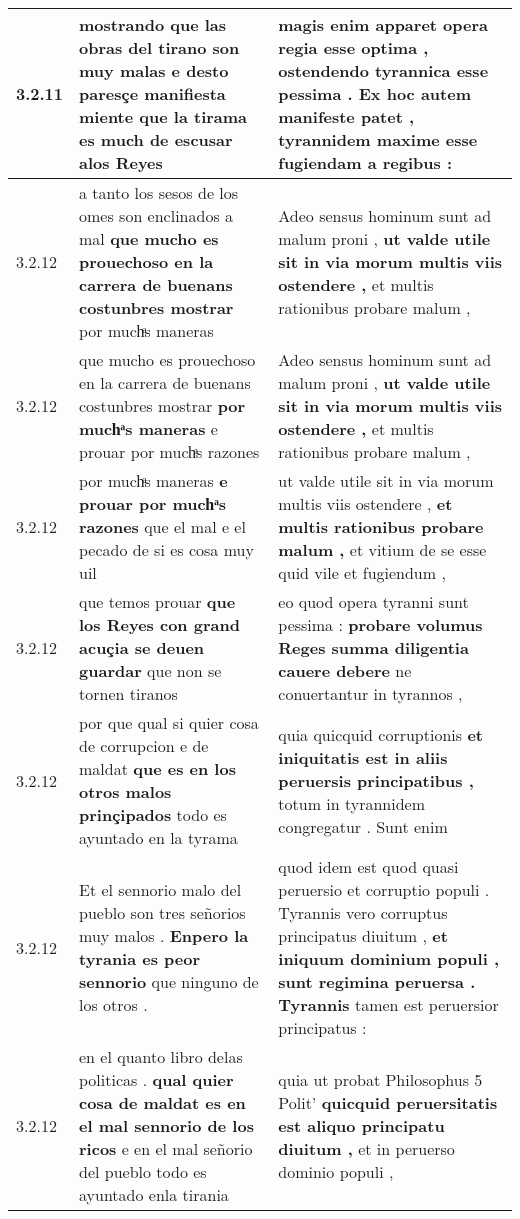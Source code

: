 \begin{tabular}{|p{1cm}|p{6.5cm}|p{6.5cm}|}
3.2.11 & mostrando que las obras del tirano son muy malas \textbf{ e desto paresçe manifiesta miente } que la tirama es much de escusar alos Reyes & magis enim apparet opera regia esse optima , ostendendo tyrannica esse pessima . \textbf{ Ex hoc autem manifeste patet , } tyrannidem maxime esse fugiendam a regibus : \\\hline
3.2.12 & a tanto los sesos de los omes son enclinados a mal \textbf{ que mucho es prouechoso en la carrera de buenans costunbres mostrar } por muchͣs maneras & Adeo sensus hominum sunt ad malum proni , \textbf{ ut valde utile sit in via morum multis viis ostendere , } et multis rationibus probare malum , \\\hline
3.2.12 & que mucho es prouechoso en la carrera de buenans costunbres mostrar \textbf{ por muchͣs maneras } e prouar por muchͣs razones & Adeo sensus hominum sunt ad malum proni , \textbf{ ut valde utile sit in via morum multis viis ostendere , } et multis rationibus probare malum , \\\hline
3.2.12 & por muchͣs maneras \textbf{ e prouar por muchͣs razones } que el mal e el pecado de si es cosa muy uil & ut valde utile sit in via morum multis viis ostendere , \textbf{ et multis rationibus probare malum , } et vitium de se esse quid vile et fugiendum , \\\hline
3.2.12 & que temos prouar \textbf{ que los Reyes con grand acuçia se deuen guardar } que non se tornen tiranos & eo quod opera tyranni sunt pessima : \textbf{ probare volumus Reges summa diligentia cauere debere } ne conuertantur in tyrannos , \\\hline
3.2.12 & por que qual si quier cosa de corrupcion e de maldat \textbf{ que es en los otros malos prinçipados } todo es ayuntado en la tyrama & quia quicquid corruptionis \textbf{ et iniquitatis est in aliis peruersis principatibus , } totum in tyrannidem congregatur . Sunt enim \\\hline
3.2.12 & Et el sennorio malo del pueblo son tres señorios muy malos . \textbf{ Enpero la tyrania es peor sennorio } que ninguno de los otros . & quod idem est quod quasi peruersio et corruptio populi . Tyrannis vero corruptus principatus diuitum , \textbf{ et iniquum dominium populi , sunt regimina peruersa . Tyrannis } tamen est peruersior principatus : \\\hline
3.2.12 & en el quanto libro delas politicas . \textbf{ qual quier cosa de maldat es en el mal sennorio de los ricos } e en el mal señorio del pueblo todo es ayuntado enla tirania & quia ut probat Philosophus 5 Polit’ \textbf{ quicquid peruersitatis est aliquo principatu diuitum , } et in peruerso dominio populi , \\\hline

\end{tabular}
